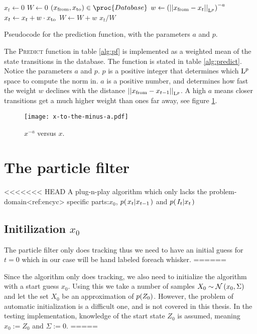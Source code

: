 \begin{table}[h]
  \begin{codebox}
    \li $ x_t \gets 0$
    \li $ W \gets 0$
    \li \ForEach $(\tf, \tt) \in \proc{Database}$
    \li \Do
      \li $ w \gets \left(\Lpnorm[p]{\tf - x_t}\right)^{-a}$
      \li $ x_t \gets x_t + w \cdot \tt$
      \li $ W \gets W + w$
    \End
    \li \Return $x_t / W$
  \end{codebox}
  \caption{Pseudocode for the prediction function, with the parameters $a$ and $p$.}
  \label{alg:predict}
\end{table}

The \textsc{Predict} function in table \ref{alg:pf} is implemented as a weighted mean of the
state transitions in the database. The function is stated in table
\ref{alg:predict}. Notice the parameters $a$ and $p$. $p$ is a
positive integer that determines which $\Lp$ space to compute the norm
in. $a$ is a positive number, and determines how fast the weight $w$
declines with the distance $\Lpnorm[p]{\tf - x_{t-1}}$. A high $a$
means closer transitions get a much higher weight than ones far away,
see figure \ref{fig:x-to-the-minus-a}.

\begin{figure}
  \centering
  \texttt{[image: x-to-the-minus-a.pdf]}
  \caption{$x^{-a}$ versus $x$.}
  \label{fig:x-to-the-minus-a}
\end{figure}




\section{The particle filter}
<<<<<<< HEAD
    A plug-n-play algorithm which only lacks the problem-domain<ref:encyc> specific parts:$x_0$, $\cprob{x_t}{x_{t-1}}$ and $\cprob{I_t}{x_t}$
    \subsection{Initilization $x_0$}
        The particle filter only does tracking thus we need to have an initial guess for $t=0$ which in our case will be hand labeled foreach whisker.
   ======

Since the algorithm only does tracking, we also need to initialize the algorithm with a start guess $x_0$. 
Using this we take a number of samples $X_0 \sim \ndist{x_0}{\Sigma}$ and let the set $X_0$ be an approximation 
of $\prob{Z_0}$. However, the problem of automatic initialization is a difficult one\cite{Hedvig}, and is not covered in this thesis. 
In the testing implementation, knowledge of the start state $Z_0$ is assumed, meaning $x_0 := Z_0$ and $\Sigma := 0$.
=====
    
